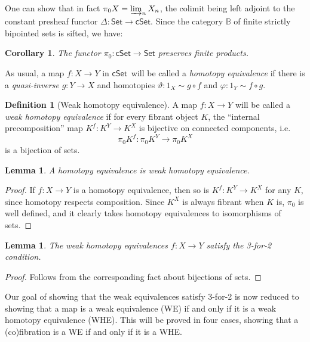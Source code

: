 \documentclass[12pt]{article}
\newcommand{\B}{\ensuremath{\mathbb{B}}}
\newcommand{\Set}{\ensuremath{\mathsf{Set}}}
\newcommand{\cSet}{\ensuremath{\mathsf{cSet}}}
\newcommand{\ra}{\ensuremath{\rightarrow}}
\newtheorem{lemma}[theorem]{Lemma}
\newtheorem{corollary}[theorem]{Corollary}
\theoremstyle{remark}
\theoremstyle{definition}
\newtheorem{definition}[theorem]{Definition}
\begin{document}
One can show that in fact $\pi_0X = \varinjlim_n X_n$, the colimit being left adjoint to the constant presheaf functor $\Delta : \Set\ra\cSet$. Since the category $\B$ of finite strictly bipointed sets is sifted, we have:

\begin{corollary}
The functor $\pi_0: \cSet\ra\Set$ preserves finite products. 
\end{corollary}

As usual, a map $f: X\ra Y$ in \cSet\ will be called a \emph{homotopy equivalence} if there is a \emph{quasi-inverse} $g: Y\ra X$ and homotopies $\vartheta : 1_X \sim g\circ f$ and $\varphi : 1_Y\sim f\circ g$.

\begin{definition}[Weak homotopy equivalence]
A map $f: X\ra Y$ will be called a \emph{weak homotopy equivalence} if for every fibrant object $K$, the ``internal precomposition'' map $K^f : K^Y \ra K^X$ is bijective on connected components, i.e.\  $$\pi_0K^f : \pi_0K^Y \ra \pi_0K^X$$ is a bijection of sets.
\end{definition}

\begin{lemma}\label{lemma:HEisWHE}
A homotopy equivalence is weak homotopy equivalence.
\end{lemma}
\begin{proof}
If $f: X\ra Y$ is a homotopy equivalence, then so is $K^f : K^Y \ra K^X$ for any $K$, since homotopy respects composition. Since $K^X$ is always fibrant when $K$ is, $\pi_0$ is well defined, and it clearly takes homotopy equivalences to isomorphisms of sets.
\end{proof}


\begin{lemma}
The weak homotopy equivalences $f : X\ra Y$ satisfy the 3-for-2 condition. 
\end{lemma}
\begin{proof}
Follows from the corresponding fact about bijections of sets.
\end{proof}

Our goal of showing that the weak equivalences satisfy 3-for-2 is now reduced to showing that a map is a weak equivalence (WE) if and only if it is a weak homotopy equivalence (WHE). This will be proved in four cases, showing that a (co)fibration is a WE if and only if it is a WHE. 
\end{document}
